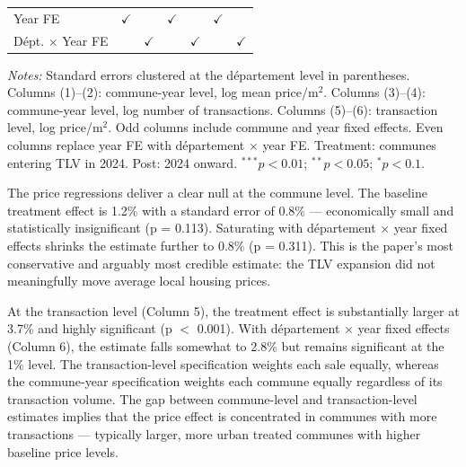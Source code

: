 \documentclass[12pt]{article}
\begin{document}
\begin{table}[htbp]
\begin{threeparttable}
\begin{tabular}{lcccccc}
      Year FE                      & $\checkmark$  &               & $\checkmark$    &                & $\checkmark$   & \\
      D\'ept. $\times$ Year FE     &               & $\checkmark$  &                 & $\checkmark$   &                & $\checkmark$\\
      \bottomrule
   \end{tabular}
   \begin{tablenotes}[flushleft]\small
   \item \textit{Notes:} Standard errors clustered at the d\'epartement level in parentheses. Columns (1)--(2): commune-year level, log mean price/m$^2$. Columns (3)--(4): commune-year level, log number of transactions. Columns (5)--(6): transaction level, log price/m$^2$. Odd columns include commune and year fixed effects. Even columns replace year FE with d\'epartement $\times$ year FE. Treatment: communes entering TLV in 2024. Post: 2024 onward. $^{***}p<0.01$; $^{**}p<0.05$; $^{*}p<0.1$.
   \end{tablenotes}
   \end{threeparttable}
\end{table}

The price regressions deliver a clear null at the commune level. The baseline treatment effect is 1.2\% with a standard error of 0.8\% --- economically small and statistically insignificant (p = 0.113). Saturating with d\'epartement $\times$ year fixed effects shrinks the estimate further to 0.8\% (p = 0.311). This is the paper's most conservative and arguably most credible estimate: the TLV expansion did not meaningfully move average local housing prices.

At the transaction level (Column 5), the treatment effect is substantially larger at 3.7\% and highly significant (p $<$ 0.001). With d\'epartement $\times$ year fixed effects (Column 6), the estimate falls somewhat to 2.8\% but remains significant at the 1\% level. The transaction-level specification weights each sale equally, whereas the commune-year specification weights each commune equally regardless of its transaction volume. The gap between commune-level and transaction-level estimates implies that the price effect is concentrated in communes with more transactions --- typically larger, more urban treated communes with higher baseline price levels.
\end{document}
